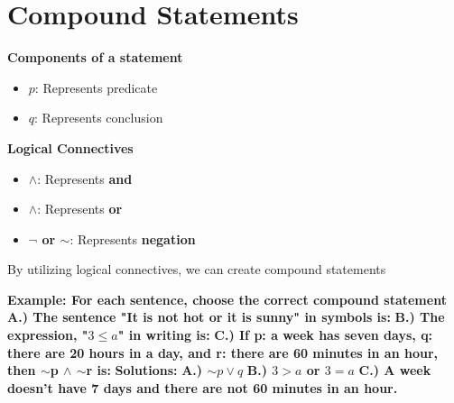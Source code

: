 \documentclass{report}
\begin{document}
    \section{Compound Statements}
    \textbf{Components of a statement}
    \begin{itemize}
      \item \textbf{$p$}: Represents predicate
      \item \textbf{$q$}: Represents conclusion
    \end{itemize}
    \bigbreak \noindent 
    \textbf{Logical Connectives}
    \begin{itemize}
      \item \textbf{$\wedge$}: Represents \textbf{and}
      \item \textbf{$\land$}: Represents \textbf{or}
      \item \textbf{$\neg$ or $\sim$}: Represents \textbf{negation}
    \end{itemize}
    \bigbreak \noindent 
    By utilizing logical connectives, we can create compound statements
    \pagebreak \bigbreak \noindent 
    \begin{mdframed}
      \textbf{Example: For each sentence, choose the correct compound statement}
      \bigbreak \noindent 
      \textbf{A.) The sentence "It is not hot or it is sunny" in symbols is:}
      \bigbreak \noindent 
      \textbf{B.) The expression, "$3 \leq a$" in writing is:}
      \bigbreak \noindent 
      \textbf{C.) If p: a week has seven days, q: there are 20 hours in a day, and r: there are 60 minutes in an hour, then $\sim$p $\wedge$ $\sim$r is:}
      \bigbreak \noindent 
      \textbf{Solutions:}
      \bigbreak \noindent 
      \textbf{A.) $\sim p \lor q$}
      \bigbreak \noindent 
      \textbf{B.) $3 > a$  or $3 = a $}
      \bigbreak \noindent 
      \textbf{C.) A week doesn't have 7 days and there are not 60 minutes in an hour. }
    \end{mdframed}

    \bigbreak \noindent \bigbreak \noindent 
\end{document}
